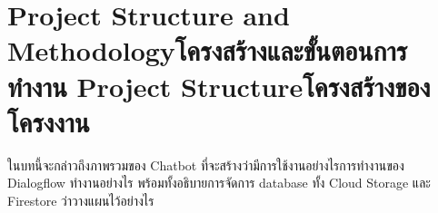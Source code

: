 \chapter{\ifproject%
    \ifenglish Project Structure and Methodology\else โครงสร้างและขั้นตอนการทำงาน\fi
  \else%
    \ifenglish Project Structure\else โครงสร้างของโครงงาน\fi
  \fi
 }

ในบทนี้จะกล่าวถึงภาพรวมของ Chatbot ที่จะสร้างว่ามีการใช้งานอย่างไรการทำงานของ Dialogflow ทำงานอย่างไร
พร้อมทั้งอธิบายการจัดการ database ทั้ง Cloud Storage และ Firestore ว่าวางแผนไว้อย่างไร

\makeatletter


\makeatother

